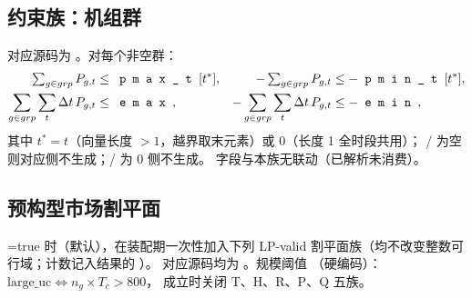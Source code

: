 \subsection{约束族：机组群}

对应源码为 。对每个非空群：
\begin{align}
\textstyle\sum_{g\in grp}P_{g,t}&\le \fld{pmax\_t}[t^\ast], &
-\textstyle\sum_{g\in grp}P_{g,t}&\le -\fld{pmin\_t}[t^\ast], \label{eq:impl-grpout}\\
\sum_{g\in grp}\sum_t \Delta t\,P_{g,t}&\le \fld{emax}, &
-\sum_{g\in grp}\sum_t \Delta t\,P_{g,t}&\le -\fld{emin}, \label{eq:impl-grpeng}
\end{align}
其中 $t^\ast=t$（向量长度 $>1$，越界取末元素）或 $0$（长度 1 全时段共用）；
/ 为空则对应侧不生成；/ 为 0
侧不生成。 字段与本族无联动（已解析未消费）。

\subsection{预构型市场割平面}
\label{sec:impl-cuts}

=true 时（默认），在装配期一次性加入下列 LP-valid
割平面族（均不改变整数可行域；计数记入结果的 ）。
对应源码均为 。规模阈值
（硬编码）：$\mathrm{large\_uc}\Leftrightarrow n_g\times T_c>800$，
成立时关闭 T、H、R、P、Q 五族。

